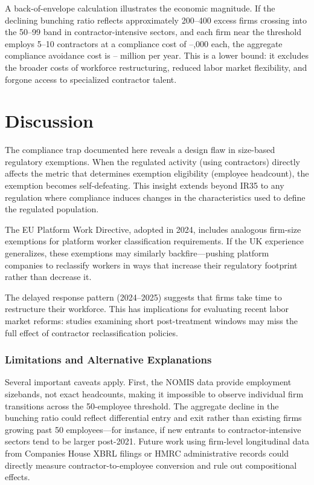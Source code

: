\documentclass[12pt]{article}
\begin{document}
A back-of-envelope calculation illustrates the economic magnitude. If the declining bunching ratio reflects approximately 200--400 excess firms crossing into the 50--99 band in contractor-intensive sectors, and each firm near the threshold employs 5--10 contractors at a compliance cost of --,000 each, the aggregate compliance avoidance cost is -- million per year. This is a lower bound: it excludes the broader costs of workforce restructuring, reduced labor market flexibility, and forgone access to specialized contractor talent.


\section{Discussion}

The compliance trap documented here reveals a design flaw in size-based regulatory exemptions. When the regulated activity (using contractors) directly affects the metric that determines exemption eligibility (employee headcount), the exemption becomes self-defeating. This insight extends beyond IR35 to any regulation where compliance induces changes in the characteristics used to define the regulated population.

The EU Platform Work Directive, adopted in 2024, includes analogous firm-size exemptions for platform worker classification requirements. If the UK experience generalizes, these exemptions may similarly backfire---pushing platform companies to reclassify workers in ways that increase their regulatory footprint rather than decrease it.

The delayed response pattern (2024--2025) suggests that firms take time to restructure their workforce. This has implications for evaluating recent labor market reforms: studies examining short post-treatment windows may miss the full effect of contractor reclassification policies.

\subsubsection*{Limitations and Alternative Explanations} Several important caveats apply. First, the NOMIS data provide employment sizebands, not exact headcounts, making it impossible to observe individual firm transitions across the 50-employee threshold. The aggregate decline in the bunching ratio could reflect differential entry and exit rather than existing firms growing past 50 employees---for instance, if new entrants to contractor-intensive sectors tend to be larger post-2021. Future work using firm-level longitudinal data from Companies House XBRL filings or HMRC administrative records could directly measure contractor-to-employee conversion and rule out compositional effects.
\end{document}
